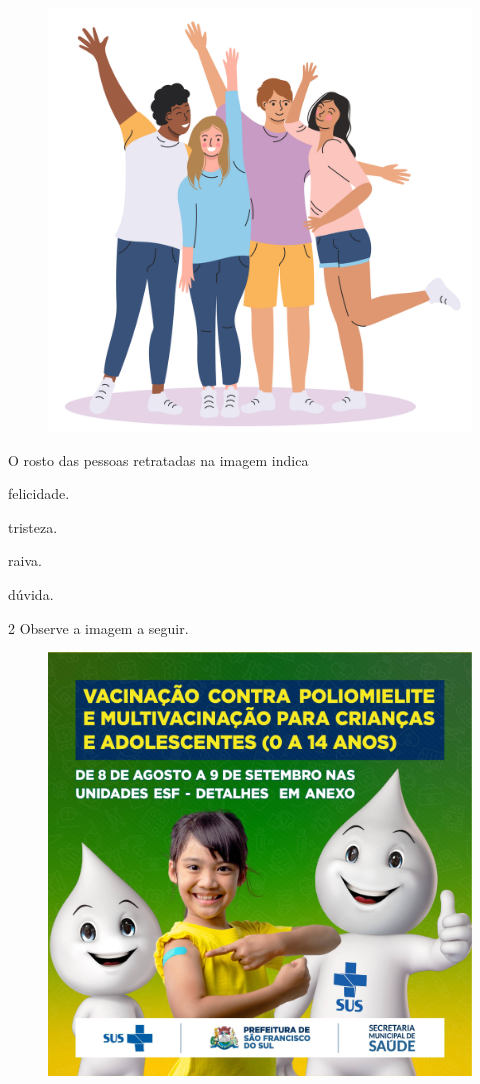 \begin{figure}[H]
\centering
\includegraphics[width=.7\textwidth]{media/image207.jpg}
\end{figure}

O rosto das pessoas retratadas na imagem indica

\begin{escolha}
\item felicidade.

\item tristeza.

\item raiva.

\item dúvida.
\end{escolha}

\num{2} Observe a imagem a seguir.

\begin{figure}[H]
\centering
\includegraphics[width=.7\textwidth]{media/image208.jpg}
\end{figure}

